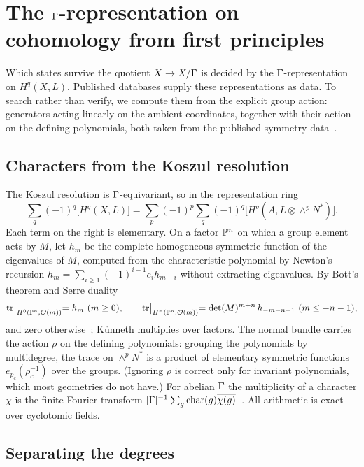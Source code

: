 \section{The $\Gamma$-representation on cohomology from first principles}
\label{sec:equivariant}

Which states survive the quotient $X\to X/\Gamma$ is decided by the
$\Gamma$-representation on $H^q(X,L)$. Published databases supply these
representations as data. To search rather than verify, we compute them from the
explicit group action: generators acting linearly on the ambient coordinates,
together with their action on the defining polynomials, both taken from the
published symmetry data~\cite{Braun2011,OxfordCICY}.

\subsection{Characters from the Koszul resolution}

The Koszul resolution is $\Gamma$-equivariant, so in the representation ring
\begin{equation}\label{eq:equivariant-koszul}
\sum_q(-1)^q\bigl[H^q(X,L)\bigr]=\sum_p(-1)^p\sum_q(-1)^q\bigl[H^q(A,L\otimes\wedge^pN^*)\bigr].
\end{equation}
Each term on the right is elementary. On a factor $\mathbb{P}^n$ on which a group element
acts by $M$, let $h_m$ be the complete homogeneous symmetric function of the
eigenvalues of $M$, computed from the characteristic polynomial by Newton's
recursion $h_m=\sum_{i\ge1}(-1)^{i-1}e_ih_{m-i}$ without extracting eigenvalues.
By Bott's theorem and Serre duality
\[
\tr\bigl|_{H^0(\PP^n,\Oc(m))}=h_m\ (m\ge0),\qquad
\tr\bigl|_{H^n(\PP^n,\Oc(m))}=\det(M)^{m+n}\,h_{-m-n-1}\ (m\le-n-1),
\]
and zero otherwise~\cite{Hartshorne1977}; Künneth multiplies over factors. The normal bundle carries
the action $\rho$ on the defining polynomials: grouping the polynomials by
multidegree, the trace on $\wedge^pN^*$ is a product of elementary symmetric
functions $e_{p_c}(\rho_c^{-1})$ over the groups. (Ignoring $\rho$ is correct only
for invariant polynomials, which most geometries do not have.) For abelian
$\Gamma$ the multiplicity of a character $\chi$ is the finite Fourier transform
$|\Gamma|^{-1}\sum_g\operatorname{char}(g)\overline{\chi(g)}$~\cite{Serre1977}.
All arithmetic is exact over cyclotomic fields.

\subsection{Separating the degrees}

